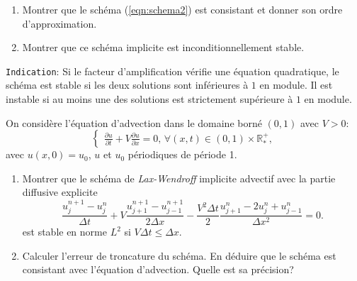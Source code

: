 \documentclass[12pt,a4paper]{article}
\begin{document}
\begin{enumerate}
\item Montrer que le schéma (\ref{eqn:schema2}) est consistant et donner son ordre d'approximation.
\item Montrer que ce sch\'ema implicite est inconditionnellement stable. 
\end{enumerate}
\texttt{Indication}: Si le facteur d'amplification vérifie une équation quadratique, le schéma est stable si les deux solutions sont inférieures à $1$ en module. Il est instable si au moins une des solutions est strictement supérieure à $1$ en module.\\


\noindent On considère l'\'equation d'advection dans le domaine born\'e $(0,1)$ avec $V>0$:
$$
\begin{cases}
\displaystyle\frac{\partial u}{\partial t}+V\frac{\partial u}{\partial
  x}=0,\, \forall (x,t)\in(0,1)\times\mathbb{R}^+_*,
\end{cases}
$$
avec $u(x, 0) = u_0$, $u$ et $u_0$ p\'eriodiques de p\'eriode 1. \\

\begin{enumerate}
\item Montrer que le sch\'ema de {\it Lax-Wendroff} implicite advectif avec la partie diffusive explicite
$$
\frac{u_j^{n+1}-u_{j}^{n}}{\Delta t}+V
\frac{u_{j+1}^{n+1}-u_{j-1}^{n+1}}{2\Delta x}-\frac{V^2\Delta t}{2}\frac{u_{j+1}^{n}-2u_j^n+u_{j-1}^{n}}{\Delta x^2}=0.
$$
est stable en norme $L^2$ si $V\Delta t \le \Delta x$. \\

\item Calculer l'erreur de troncature du sch\'ema.
En d\'eduire que le sch\'ema est consistant avec l'\'equation d'advection. Quelle est sa précision? 

%
%
\end{enumerate}
\end{document}
